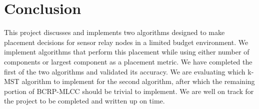 \documentclass{article}
\begin{document}
\section{Conclusion}

This project discusses and implements two algorithms designed to make placement decisions for sensor relay nodes in a limited budget environment.
We implement algorithms that perform this placement while using either number of components or largest component as a placement metric.
We have completed the first of the two algorithms and validated its accuracy.
We are evaluating which k-MST algorithm to implement for the second algorithm, after which the remaining portion of BCRP-MLCC should be trivial to implement.
We are well on track for the project to be completed and written up on time.






\end{document}
